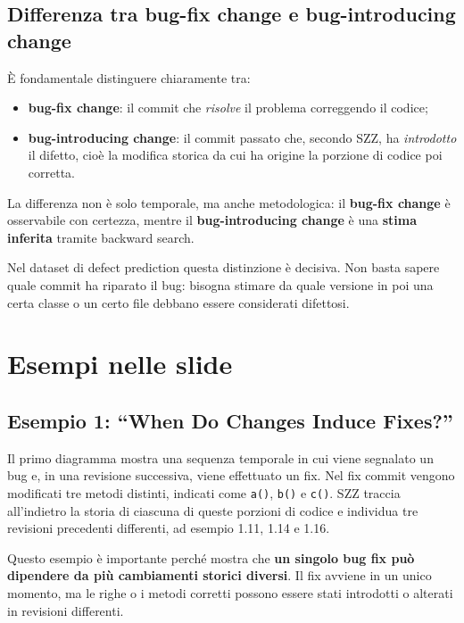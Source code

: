 \subsection{Differenza tra bug-fix change e bug-introducing change}

È fondamentale distinguere chiaramente tra:

\begin{itemize}
    \item \textbf{bug-fix change}: il commit che \emph{risolve} il problema correggendo il codice;
    \item \textbf{bug-introducing change}: il commit passato che, secondo SZZ, ha \emph{introdotto} il difetto, cioè la modifica storica da cui ha origine la porzione di codice poi corretta.
\end{itemize}

La differenza non è solo temporale, ma anche metodologica: il \textbf{bug-fix change} è osservabile con certezza, mentre il \textbf{bug-introducing change} è una \textbf{stima inferita} tramite backward search.

\begin{notaprof}
Nel dataset di defect prediction questa distinzione è decisiva. Non basta sapere quale commit ha riparato il bug: bisogna stimare da quale versione in poi una certa classe o un certo file debbano essere considerati difettosi.
\end{notaprof}

\section{Esempi nelle slide}

\subsection{Esempio 1: ``When Do Changes Induce Fixes?''}

\begin{notaslide}
Il primo diagramma mostra una sequenza temporale in cui viene segnalato un bug e, in una revisione successiva, viene effettuato un fix. Nel fix commit vengono modificati tre metodi distinti, indicati come \texttt{a()}, \texttt{b()} e \texttt{c()}. SZZ traccia all'indietro la storia di ciascuna di queste porzioni di codice e individua tre revisioni precedenti differenti, ad esempio 1.11, 1.14 e 1.16.
\end{notaslide}

Questo esempio è importante perché mostra che \textbf{un singolo bug fix può dipendere da più cambiamenti storici diversi}. Il fix avviene in un unico momento, ma le righe o i metodi corretti possono essere stati introdotti o alterati in revisioni differenti.

